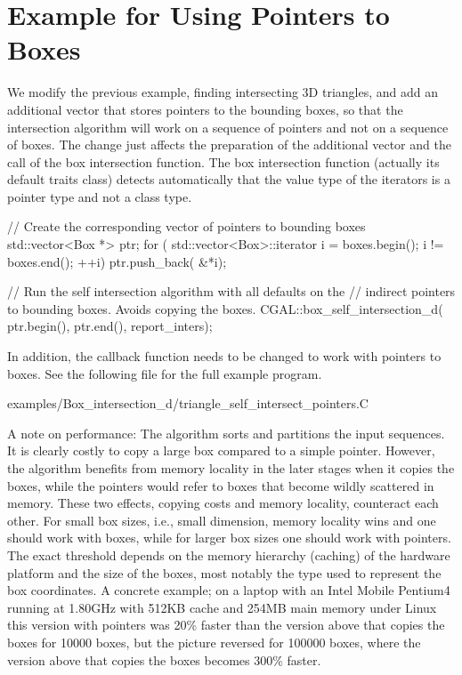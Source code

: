 

\section{Example for Using Pointers to Boxes}

We modify the previous example, finding intersecting 3D triangles,
and add an additional vector  that stores pointers to the bounding
boxes, so that the intersection algorithm will work on a sequence of
pointers and not on a sequence of boxes. The change just affects the
preparation of the additional vector and the call of the box intersection
function. The box intersection function (actually its default traits
class) detects automatically that the value type of the iterators is a
pointer type and not a class type.

\begin{ccExampleCode}
    // Create the corresponding vector of pointers to bounding boxes
    std::vector<Box *> ptr;
    for ( std::vector<Box>::iterator i = boxes.begin(); i != boxes.end(); ++i)
        ptr.push_back( &*i);
    
    // Run the self intersection algorithm with all defaults on the 
    // indirect pointers to bounding boxes. Avoids copying the boxes.
    CGAL::box_self_intersection_d( ptr.begin(), ptr.end(), report_inters);
\end{ccExampleCode}

In addition, the callback function  needs to be
changed to work with pointers to boxes. See the following file for the
full example program.

\begin{ccExampleCode}
    examples/Box_intersection_d/triangle_self_intersect_pointers.C
\end{ccExampleCode}

A note on performance: The algorithm sorts and partitions the input
sequences. It is clearly costly to copy a large box compared to a
simple pointer. However, the algorithm benefits from memory locality
in the later stages when it copies the boxes, while the pointers would
refer to boxes that become wildly scattered in memory.  These two
effects, copying costs and memory locality, counteract each other. For
small box sizes, i.e., small dimension, memory locality wins and one
should work with boxes, while for larger box sizes one should work
with pointers. The exact threshold depends on the memory hierarchy
(caching) of the hardware platform and the size of the boxes, most
notably the type used to represent the box coordinates. A concrete
example; on a laptop with an Intel Mobile Pentium4 running at 1.80GHz
with 512KB cache and 254MB main memory under Linux this version with
pointers was 20\% faster than the version above that copies the boxes
for 10000 boxes, but the picture reversed for 100000 boxes, where the
version above that copies the boxes becomes 300\% faster.

